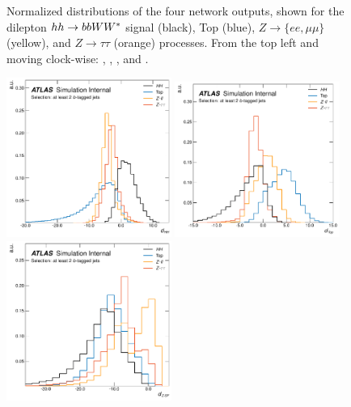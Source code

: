 \begin{figure}[!htb]
\begin{center}
        \caption{
            Normalized distributions of the four network outputs,
            shown for the dilepton
            $hh \rightarrow bbWW^*$ signal (black), Top (blue), $Z \rightarrow \{ee,\mu\mu\}$ (yellow),
            and $Z\rightarrow \tau\tau$ (orange) processes.
            From the top left and moving clock-wise: \phh, \ptop, \pztt, and \pzsf.
        }
        \label{fig:nn_disc_p}
    \end{center}
\end{figure}

\begin{figure}[!htb]
    \begin{center}
        \includegraphics[width=0.48\textwidth]{figures/search_hh/nn_disc/pi_plot_NN_d_hh}
        \includegraphics[width=0.48\textwidth]{figures/search_hh/nn_disc/pi_plot_NN_d_top}
        \includegraphics[width=0.48\textwidth]{figures/search_hh/nn_disc/pi_plot_NN_d_zsf}

\end{center}
\end{figure}
